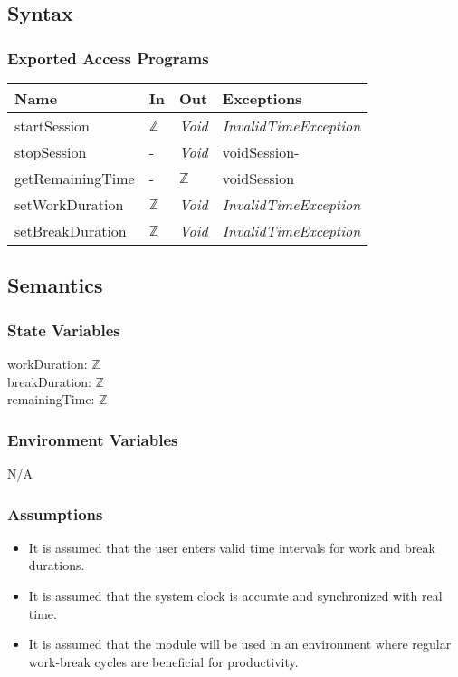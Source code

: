 \documentclass[12pt, titlepage]{article}
\begin{document}
\subsection{Syntax}

\subsubsection{Exported Access Programs}
\begin{center}
\begin{tabular}{p{4cm} p{3cm} p{3cm} p{3cm}}
\hline
\textbf{Name} & \textbf{In} & \textbf{Out} & \textbf{Exceptions} \\
\hline
startSession&  $\mathbb{Z}$ & \textit{Void} & \textit{InvalidTimeException} \\
stopSession& - & \textit{Void} &voidSession- \\
getRemainingTime& - & $\mathbb{Z}$ & voidSession \\
setWorkDuration&  $\mathbb{Z}$ & \textit{Void} & \textit{InvalidTimeException} \\
setBreakDuration&  $\mathbb{Z}$ & \textit{Void} & \textit{InvalidTimeException} \\
\hline
\end{tabular}
\end{center}

\subsection{Semantics}

\subsubsection{State Variables}
workDuration: $\mathbb{Z}$\\
breakDuration: $\mathbb{Z}$\\
remainingTime: $\mathbb{Z}$

\subsubsection{Environment Variables}
N/A

\subsubsection{Assumptions}
\begin{itemize}
  \item It is assumed that the user enters valid time intervals for work and break durations.
  \item It is assumed that the system clock is accurate and synchronized with real time.
  \item It is assumed that the module will be used in an environment where regular work-break cycles are beneficial for productivity.
\end{itemize}
\end{document}
